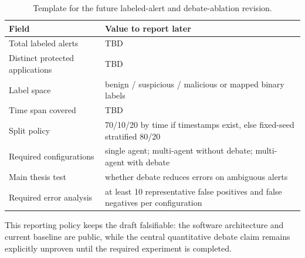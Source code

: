\begin{table}[t]
  \centering
  \caption{Template for the future labeled-alert and debate-ablation revision.}
  \label{tab:private-template}
  \footnotesize
  \begin{tabularx}{\columnwidth}{@{}p{}Y@{}}
    \toprule
    Field & Value to report later \\
    \midrule
    Total labeled alerts & TBD \\
    Distinct protected applications & TBD \\
    Label space & benign / suspicious / malicious or mapped binary labels \\
    Time span covered & TBD \\
    Split policy & 70/10/20 by time if timestamps exist, else fixed-seed stratified 80/20 \\
    Required configurations & single agent; multi-agent without debate; multi-agent with debate \\
    Main thesis test & whether debate reduces errors on ambiguous alerts \\
    Required error analysis & at least 10 representative false positives and false negatives per configuration \\
    \bottomrule
  \end{tabularx}
\end{table}

This reporting policy keeps the draft falsifiable: the software architecture and current baseline are public, while the central quantitative debate claim remains explicitly unproven until the required experiment is completed.
